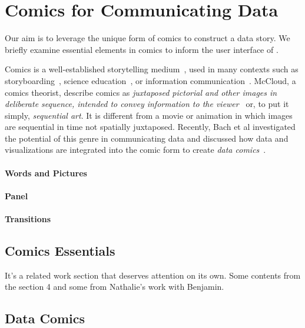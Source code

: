 \section{Comics for Communicating Data}
Our aim is to leverage the unique form of comics to construct a data story. We briefly examine essential elements in comics to inform the user interface of \toolname{}. 

Comics is a well-established storytelling medium~\cite{mccloud1993understanding,eisner2008comics}, used in many contexts such as storyboarding~\cite{haesen2010draw,moraveji2007comicboarding}, science education~\cite{green2010graphic,tatalovic2009science}, or information communication~\cite{caldwell2012information}. 
McCloud, a comics theorist, describe comics as \textit{juxtaposed pictorial and other images in deliberate sequence, intended to convey information to the viewer}~\cite{mccloud1993understanding} or, to put it simply, \textit{sequential art}. It is different from a movie or animation in which images are sequential in time not spatially juxtaposed. Recently, Bach et al investigated the potential of this genre in communicating data and discussed how data and visualizations are integrated into the comic form to create \textit{data comics}~\cite{bach2017emerging}.


\paragraph{Words and Pictures}


\paragraph{Panel}

\paragraph{Transitions}




\subsection{Comics Essentials}
It's a related work section that deserves attention on  its own. Some contents from the section 4 and some from Nathalie's work with Benjamin.

\subsection{Data Comics}

